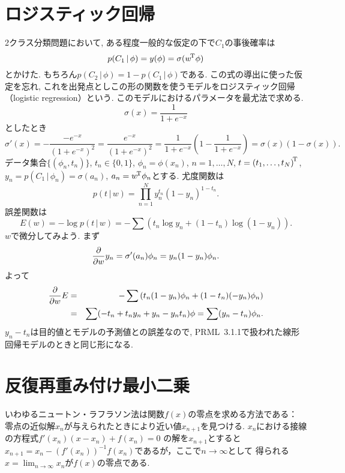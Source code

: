 \section{ロジスティック回帰}
2クラス分類問題において, ある程度一般的な仮定の下で$C_1$の事後確率は
$$
p(C_1\,|\,\phi)=y(\phi)=\sigma({w}^{\!\mathrm{T}}\phi)
$$
とかけた. もちろん$p(C_2\,|\,\phi)=1-p(C_1\,|\,\phi)$である.
この式の導出に使った仮定を忘れ, これを出発点としこの形の関数を使うモデルをロジスティック回帰（logistic regression）という.
このモデルにおけるパラメータを最尤法で求める.
$$
\sigma(x)=\frac{1}{1+e^{-x}}
$$
としたとき
\pagebreak
$$
\sigma'(x)
=-\frac{-e^{-x}}{(1+e^{-x})^2}
=\frac{e^{-x}}{(1+e^{-x})^2}
=\frac{1}{1+e^{-x}}\left(1-\frac{1}{1+e^{-x}}\right)
=\sigma(x)(1-\sigma(x)).
$$
データ集合$\{(\phi_n, t_n)\}$,
$t_n\in \{0,1\}$, $\phi_n=\phi(x_n)$, $n=1, \ldots, N$,
$t={(t_1, \ldots, t_N)}^{\!\mathrm{T}}$, $y_n=p(C_1\,|\,\phi_n)=\sigma(a_n)$, $a_n={w}^{\!\mathrm{T}}\phi_n$とする.
尤度関数は
$$
p(t\,|\,w)=\prod_{n=1}^N y_n^{t_n}(1-y_n)^{1-t_n}.
$$
誤差関数は
$$
E(w)=-\log p(t\,|\,w)=-\sum\left(t_n \log y_n + (1-t_n) \log (1-y_n)\right).
$$
$w$で微分してみよう.
まず
$$
\frac{\partial}{\partial w}y_n=\sigma'(a_n) \phi_n=y_n(1-y_n) \phi_n.
$$
よって
\begin{eqnarray*}
\frac{\partial}{\partial w}E &=&-\sum\left(t_n (1-y_n)\phi_n + (1-t_n)(-y_n)\phi_n\right)\\
 &=& \sum(-t_n+t_n y_n+y_n-y_n t_n)\phi
 = \sum(y_n-t_n)\phi_n.
\end{eqnarray*}
$y_n-t_n$は目的値とモデルの予測値との誤差なので,
PRML~3.1.1で扱われた線形回帰モデルのときと同じ形になる.

\section{反復再重み付け最小二乗}
いわゆるニュートン・ラフラソン法は関数$f(x)$の零点を求める方法である：
零点の近似解$x_n$が与えられたときにより近い値$x_{n+1}$を見つける.
$x_n$における接線の方程式$
f'(x_n)(x-x_n)+f(x_n)=0
$
の解を$x_{n+1}$とすると
$
x_{n+1}=x_n - (f'(x_n))^{-1} f(x_n)
$であるが，ここで$n\to\infty$として
得られる$x=\lim_{n\to\infty} x_n$が$f(x)$の零点である.

